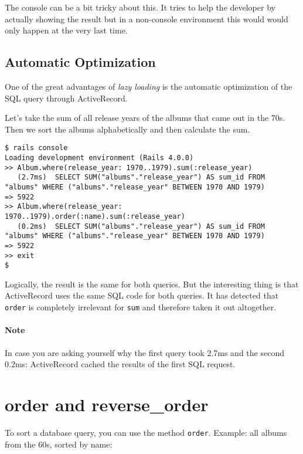 \documentclass[a4paper]{book}
\newcounter{tab}[chapter]
\begin{document}
The console can be a bit tricky about this. It tries to help the developer by actually showing the result but in a non-console environment this would would only happen at the very last time.

\subsection{Automatic Optimization}\label{automatic-optimization}

One of the great advantages of \emph{lazy loading} is the automatic optimization of the SQL query through ActiveRecord.

Let's take the sum of all release years of the albums that came out in the 70s. Then we sort the albums alphabetically and then calculate the sum.

\begin{shaded}\begin{verbatim}
$ rails console
Loading development environment (Rails 4.0.0)
>> Album.where(release_year: 1970..1979).sum(:release_year)
   (2.7ms)  SELECT SUM("albums"."release_year") AS sum_id FROM "albums" WHERE ("albums"."release_year" BETWEEN 1970 AND 1979)
=> 5922
>> Album.where(release_year: 1970..1979).order(:name).sum(:release_year)
   (0.2ms)  SELECT SUM("albums"."release_year") AS sum_id FROM "albums" WHERE ("albums"."release_year" BETWEEN 1970 AND 1979)
=> 5922
>> exit
$
\end{verbatim}\end{shaded}

Logically, the result is the same for both queries. But the interesting thing is that ActiveRecord uses the same SQL code for both queries. It has detected that \texttt{order} is completely irrelevant for \texttt{sum} and therefore taken it out altogether.

\paragraph{Note}\label{note-24}

In case you are asking yourself why the first query took 2.7ms and the second 0.2ms: ActiveRecord cached the results of the first SQL request.

\section{order and reverse\_order}\label{order-and-reverseux5forder}

To sort a database query, you can use the method \texttt{order}. Example: all albums from the 60s, sorted by name:
\end{document}
